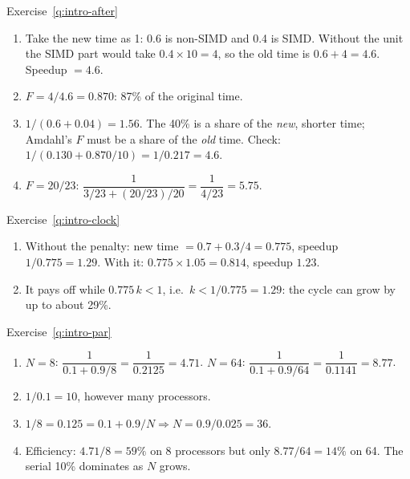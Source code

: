\begin{noot}{Exercise~\ref{q:intro-after}}
\begin{enumerate}[label=(\alph*),leftmargin=*]
  \item Take the new time as 1: 0.6 is non-SIMD and 0.4 is SIMD. Without the
  unit the SIMD part would take $0.4\times10=4$, so the old time is
  $0.6+4=4.6$. Speedup $=4.6$.
  \item $F=4/4.6=0.870$: 87\% of the original time.
  \item $1/(0.6+0.04)=1.56$. The 40\% is a share of the \emph{new}, shorter
  time; Amdahl's $F$ must be a share of the \emph{old} time. Check:
  $1/(0.130+0.870/10)=1/0.217=4.6$.
  \item $F=20/23$: $\dfrac{1}{3/23+(20/23)/20}=\dfrac{1}{4/23}=5.75$.
\end{enumerate}
\end{noot}

\begin{noot}{Exercise~\ref{q:intro-clock}}
\begin{enumerate}[label=(\alph*),leftmargin=*]
  \item Without the penalty: new time $=0.7+0.3/4=0.775$, speedup
  $1/0.775=1.29$. With it: $0.775\times1.05=0.814$, speedup $1.23$.
  \item It pays off while $0.775\,k<1$, i.e.\ $k<1/0.775=1.29$: the cycle can
  grow by up to about 29\%.
\end{enumerate}
\end{noot}

\begin{noot}{Exercise~\ref{q:intro-par}}
\begin{enumerate}[label=(\alph*),leftmargin=*]
  \item $N=8$: $\dfrac{1}{0.1+0.9/8}=\dfrac{1}{0.2125}=4.71$.
  $N=64$: $\dfrac{1}{0.1+0.9/64}=\dfrac{1}{0.1141}=8.77$.
  \item $1/0.1=10$, however many processors.
  \item $1/8=0.125=0.1+0.9/N\Rightarrow N=0.9/0.025=36$.
  \item Efficiency: $4.71/8=59\%$ on 8 processors but only $8.77/64=14\%$ on 64.
  The serial 10\% dominates as $N$ grows.
\end{enumerate}
\end{noot}

